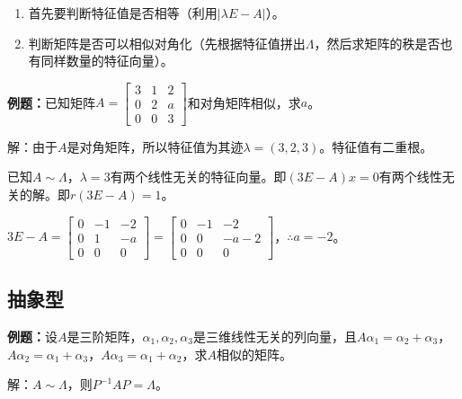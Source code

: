 \documentclass[UTF8, 12pt]{ctexart}
\begin{document}

\begin{enumerate}
    \item 首先要判断特征值是否相等（利用$\vert\lambda E-A\vert$）。
    \item 判断矩阵是否可以相似对角化（先根据特征值拼出$\Lambda$，然后求矩阵的秩是否也有同样数量的特征向量）。
\end{enumerate}

\textbf{例题：}已知矩阵$A=\left[\begin{array}{ccc}
    3 & 1 & 2 \\
    0 & 2 & a \\
    0 & 0 & 3
\end{array}\right]$和对角矩阵相似，求$a$。\medskip

解：由于$A$是对角矩阵，所以特征值为其迹$\lambda=(3,2,3)$。特征值有二重根。

已知$A\sim\Lambda$，$\lambda=3$有两个线性无关的特征向量。即$(3E-A)x=0$有两个线性无关的解。即$r(3E-A)=1$。

$3E-A=\left[\begin{array}{ccc}
    0 & -1 & -2 \\
    0 & 1 & -a \\
    0 & 0 & 0
\end{array}\right]=\left[\begin{array}{ccc}
    0 & -1 & -2 \\
    0 & 0 & -a-2 \\
    0 & 0 & 0
\end{array}\right]$，$\therefore a=-2$。

\subsection{抽象型}

\textbf{例题：}设$A$是三阶矩阵，$\alpha_1,\alpha_2,\alpha_3$是三维线性无关的列向量，且$A\alpha_1=\alpha_2+\alpha_3$，$A\alpha_2=\alpha_1+\alpha_3$，$A\alpha_3=\alpha_1+\alpha_2$，求$A$相似的矩阵。

解：$A\sim\Lambda$，则$P^{-1}AP=\Lambda$。
\end{document}
